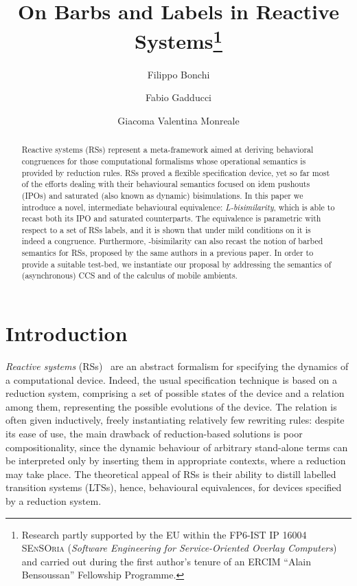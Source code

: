 \documentclass[copyright,creativecommons]{eptcs}
\title{On Barbs and Labels in Reactive Systems\thanks{Research
    partly supported by the EU within the FP6-IST IP 16004 \textsc{SEnSOria} (\emph{Software Engineering for
 Service-Oriented Overlay Computers}) and carried out during the first author's tenure of
an ERCIM ``Alain Bensoussan'' Fellowship Programme.}}
\author{Filippo Bonchi
\institute{Centrum voor Wiskunde en
Informatica, Amsterdam, The Netherlands}
\email{Filippo.Bonchi@cwi.nl}
\and
Fabio Gadducci
\institute{Dipartimento di Informatica,
Universit\`a di Pisa, Italy}
\email{fabio@di.unipi.it}
\and
Giacoma Valentina Monreale
\institute{Dipartimento di Informatica,
Universit\`a di Pisa, Italy}
\email{vale@di.unipi.it}
}
\newcommand{\<}{\langle}
\renewcommand{\>}{\rangle}
\begin{document}
\maketitle

\begin{abstract}
  Reactive systems (RSs) represent a meta-framework aimed at deriving
  behavioral congruences for those computational formalisms whose
  operational semantics is provided by reduction rules. RSs proved a
  flexible specification device, yet so far most of the efforts
  dealing with their behavioural semantics focused on idem pushouts
  (IPOs) and saturated (also known as dynamic) bisimulations. In this
  paper we introduce a novel, intermediate behavioural equivalence:
  \emph{L-bisimilarity}, which is able to recast both its IPO and
  saturated counterparts. The equivalence is parametric with respect
  to a set  of RSs labels, and it is shown that under mild
  conditions on  it is indeed a congruence. Furthermore,
  -bisimilarity can also recast the notion of barbed semantics for
  RSs, proposed by the same authors in a previous paper. In order to
  provide a suitable test-bed, we instantiate our proposal by
  addressing the semantics of (asynchronous) CCS and of the calculus
  of mobile ambients.
\end{abstract}



\section{Introduction}
\label{sec:Intro}

\emph{Reactive systems} (RSs)~\cite{DBLP:conf/concur/LeiferM00} are an
abstract formalism for specifying the dynamics of a computational
device. Indeed, the usual specification technique is based on a
reduction system, comprising a set of possible states of the device
and a relation among them, representing the possible evolutions of the
device.
The relation is often given inductively, freely instantiating
relatively few rewriting rules: despite its ease of use, the main
drawback of reduction-based solutions is poor compositionality, since
the dynamic behaviour of arbitrary stand-alone terms can be
interpreted only by inserting them in appropriate contexts, where a
reduction may take place. The theoretical appeal of RSs is their
ability to distill labelled transition systems (LTSs), hence,
behavioural equivalences, for devices specified by a reduction system.
\end{document}
